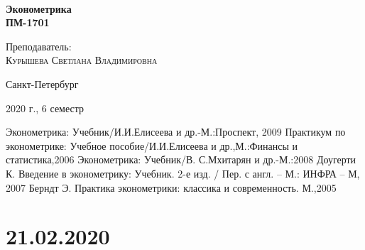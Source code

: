\documentclass[aps,%
12pt,%
final,%
oneside,
onecolumn,%
musixtex, %
superscriptaddress,%
centertags]{article} %
\begin{document}
\begin{titlepage} 
\begin{center}
 
\textbf{}\\[10.0cm]
\textbf{\LARGE Эконометрика}\\[0.5cm]
\textbf{\Large ПМ-1701} \\[0.1cm]

\begin{center} \large
{Преподаватель:} \\[0.5cm]
\textsc {Курышева Светлана Владимировна }\\
\end{center}
\vfill 

{\large {Санкт-Петербург}} \par
{\large {2020 г., 6 семестр}}
\end{center} 
\end{titlepage}

\begin{thebibliography}{3}
Эконометрика: Учебник/И.И.Елисеева и др.-М.:Проспект, 2009
Практикум по эконометрике: Учебное пособие/И.И.Елисеева и др.,М.:Финансы и статистика,2006 
Эконометрика: Учебник/В. С.Мхитарян и др.-М.:2008
Доугерти К. Введение в эконометрику: Учебник. 2-е изд. / Пер. с англ. – М.: ИНФРА – М, 2007
Берндт Э. Практика эконометрики: классика и современность. М.,2005
\end{thebibliography}
\tableofcontents
\newpage
\section{21.02.2020}
\end{document}
